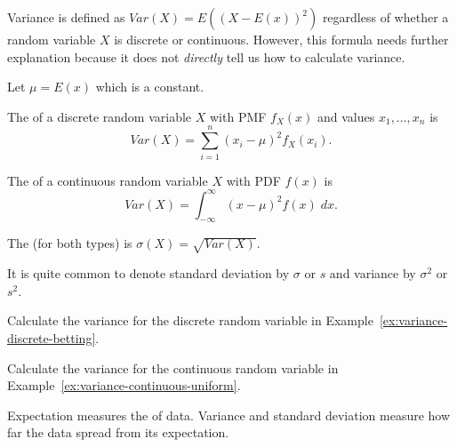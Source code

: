 \documentclass[../main.tex]{subfiles}
\begin{document}
Variance is defined as \(Var(X) = E( (X - E(x))^{2} )\) regardless of whether a random variable \(X\) is discrete or continuous. However, this formula needs further explanation because it does not \emph{directly} tell us how to calculate variance.
\begin{definition}
  Let \(\mu = E(x)\) which is a constant.

  The  of a discrete random variable \(X\) with PMF \(f_{X}(x)\) and values \(x_{1}, \ldots, x_{n}\) is 
  \begin{equation} \label{def:variance-discrete}
    Var(X) = \sum_{i=1}^{n} (x_{i} - \mu)^{2} f_{X}(x_{i}).
  \end{equation}

  The  of a continuous random variable \(X\) with PDF \(f(x)\) is 
  \begin{equation} \label{def:variance-continuous}
    Var(X) = \int_{-\infty}^{\infty} (x - \mu)^{2} f(x) \;dx.
  \end{equation}

  The  (for both types) is \(\sigma(X) = \sqrt{Var(X)}\).

  It is quite common to denote standard deviation by \(\sigma\) or \(s\) and variance by \(\sigma^{2}\) or \(s^{2}\).
\end{definition}

\begin{example}
  Calculate the variance for the discrete random variable in Example~\ref{ex:variance-discrete-betting}.

\end{example}

\begin{example}
  Calculate the variance for the continuous random variable in Example~\ref{ex:variance-continuous-uniform}.

  \blanks*
\end{example}
\clearpage

\faStar{} Expectation measures the  of data. Variance and standard deviation measure how far the data spread from its expectation.
\end{document}
